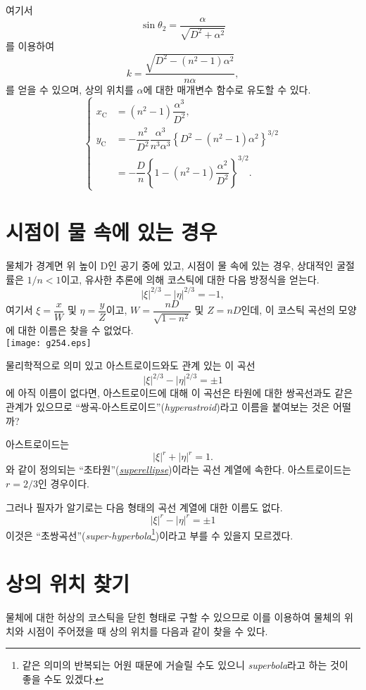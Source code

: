 \documentclass[twocolumn]{article}
\begin{document}
여기서
	$$\sin\theta_2 = \dfrac{\alpha}{\sqrt{D^2+\alpha^2}}$$
를 이용하여
	$$k = \dfrac{\sqrt{D^2-(n^2-1)\alpha^2}}{n\alpha},$$
	를 얻을 수 있으며, 
	상의 위치를 $\alpha$에 대한 매개변수 함수로 유도할 수 있다.
	$$ \left\{ 
	\begin{aligned}
		x_{\mathrm{C}}^{} &= (n^2-1)\dfrac{\alpha^3}{D^2},\\
		y_{\mathrm{C}}^{} &= -\dfrac{n^2}{D^2}\dfrac{\alpha^3}
		{n^3\alpha^3}\left\{ D^2-(n^2-1)\alpha^2 \right\}^{3/2}\\
		&=-\dfrac{D}{n}\left\{ 1-(n^2-1)\dfrac{\alpha^2}{D^2} \right\}^{3/2}.
	\end{aligned}
	\right.$$
	
\section{시점이 물 속에 있는 경우}

물체가 경계면 위 높이 D인 공기 중에 있고, 
시점이 물 속에 있는 경우, 상대적인 굴절률은 $1/n < 1$이고, 
유사한 추론에 의해 코스틱에 대한 다음 방정식을 얻는다.
$$ \left| \xi \right|^{2/3} - \left| \eta \right|^{2/3} = -1, $$
여기서 $\xi = \dfrac{x}{W} $ 및 $\eta = \dfrac{y}{Z}$이고, 
$W = \dfrac{nD}{\sqrt{1-n^2}}$ 및 $Z = nD$인데,  
이 코스틱 곡선의 모양에 대한 이름은 찾을 수 없었다. \\


\texttt{[image: g254.eps]}

물리학적으로 의미 있고 아스트로이드와도 관계 있는 이 곡선
$$ \left| \xi \right|^{2/3} - \left| \eta \right|^{2/3} = \pm1 $$
에 아직 이름이 없다면, 아스트로이드에 대해 이 곡선은 타원에 대한 쌍곡선과도 같은 관계가 있으므로 
``쌍곡-아스트로이드''(\emph{hyperastroid})라고 이름을 붙여보는 것은 어떨까?

아스트로이드는 
$$ \left| \xi \right|^{r} + \left| \eta \right|^{r} = 1. $$
와 같이 정의되는 ``초타원''(\href{https://mathworld.wolfram.com/Astroid.html}%
{\emph{superellipse}})이라는 곡선 계열에 속한다. 
아스트로이드는 $r=2/3$인 경우이다.
 
그러나 필자가 알기로는 다음 형태의 곡선 계열에 대한 이름도 없다.
$$ \left| \xi \right|^{r} - \left| \eta \right|^{r} = \pm 1 $$
이것은 ``초쌍곡선''(\emph{super-hyperbola}\footnote{같은 의미의 반복되는 어원
때문에 거슬릴 수도 있으니 \emph{superbola}라고 하는 것이 
좋을 수도 있겠다.})이라고 부를 수 있을지 모르겠다.

\section{상의 위치 찾기}
물체에 대한 허상의 코스틱을 닫힌 형태로 구할 수 있으므로 이를 이용하여 물체의 위치와 
시점이 주어졌을 때 상의 위치를 다음과 같이 찾을 수 있다.
\end{document}
